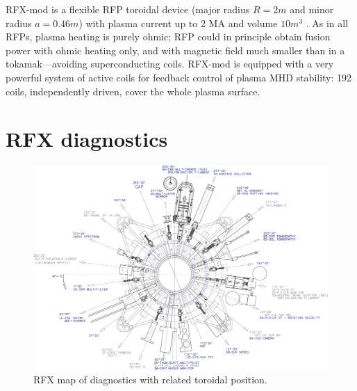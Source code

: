 RFX-mod is a flexible \ac{RFP} toroidal device (major radius $R=2 m$ and minor radius $a=0.46 m$) with plasma current up to 2 MA \cite{2MA_RFX_Current} and volume $10 m^3$ \cite{SONATO200597}. As in all RFPs, plasma heating is purely ohmic; \acl{RFP} could in principle obtain fusion power with ohmic heating only, and with magnetic field much smaller than in a tokamak—avoiding superconducting coils. RFX-mod is equipped with a very powerful system of active coils for feedback control of plasma MHD stability: 192 coils, independently driven, cover the whole plasma surface.





\section{RFX diagnostics}

%
\begin{figure}[ht!]
\includegraphics[width=1\textwidth]{img/rfx/Layout_Diagnosiche_AA10005.eps} \centering
\caption{RFX map of diagnostics with related toroidal position.}
\label{rfx}
\end{figure}
%

